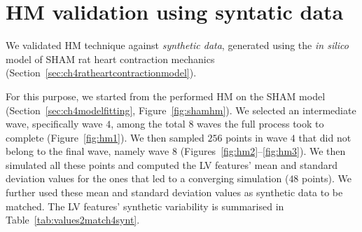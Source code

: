 %
%
%
\cleardoublepage
\section{HM validation using syntatic data}\label{chA:HM_validation_using_syntatic_data}
We validated HM technique against \textit{synthetic data}, generated using the \textit{in silico} model of SHAM rat heart contraction mechanics (Section~\ref{sec:ch4ratheartcontractionmodel}).

\vspace{0.2cm}
For this purpose, we started from the performed HM on the SHAM model (Section~\ref{sec:ch4modelfitting}, Figure~\ref{fig:shamhm}). We selected an intermediate wave, specifically wave $4$, among the total $8$ waves the full process took to complete (Figure~\ref{fig:hm1}). We then sampled $256$ points in wave $4$ that did not belong to the final wave, namely wave $8$ (Figures~\ref{fig:hm2}--\ref{fig:hm3}). We then simulated all these points and computed the LV features' mean and standard deviation values for the ones that led to a converging simulation ($48$ points). We further used these mean and standard deviation values as synthetic data to be matched. The LV features' synthetic variability is summarised in Table~\ref{tab:values2match4synt}.

